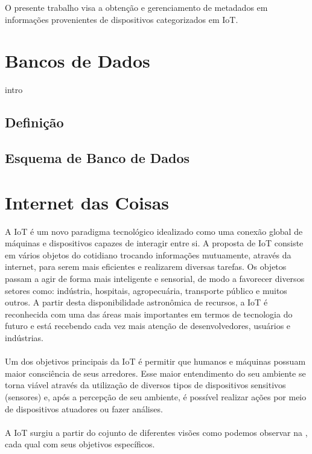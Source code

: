 O presente trabalho visa a obtenção e gerenciamento de metadados em informações provenientes de
dispositivos categorizados em \acrfull{IoT}. %

\section{Bancos de Dados}
intro
\subsection{Definição}
\subsection{Esquema de Banco de Dados}




\section{Internet das Coisas}%
A \acrlong{IoT} é um novo paradigma tecnológico idealizado como uma conexão global
de máquinas e dispositivos capazes de interagir entre si. A proposta de \acrshort{IoT} consiste em vários objetos do cotidiano trocando informações
mutuamente, através da internet, para serem mais eficientes e realizarem diversas tarefas.
Os objetos passam a agir de forma mais inteligente e sensorial, de modo a favorecer diversos setores como:
indústria, hospitais, agropecuária, transporte público e muitos outros. A partir desta
disponibilidade astronômica de recursos, a \acrshort{IoT} é reconhecida com uma das áreas mais importantes
em termos de tecnologia do futuro e está recebendo cada vez mais atenção de desenvolvedores, usuários e indústrias.
\\\\Um dos objetivos principais da \acrlong{IoT} é permitir
que humanos e máquinas possuam maior consciência de seus arredores.
 Esse maior entendimento do seu ambiente se torna viável através da utilização
 de diversos tipos de dispositivos sensitivos (sensores) e, após a percepção
 de seu ambiente, é possível realizar ações por meio de dispositivos atuadores ou fazer análises.\\\\
 A \acrlong{IoT} surgiu a partir do cojunto de diferentes visões como podemos observar na , cada qual com seus objetivos específicos.
